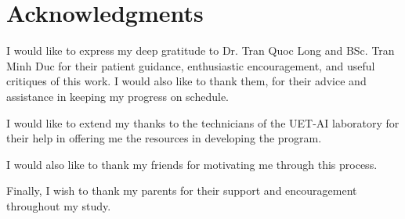 \chapter*{Acknowledgments}
\fontsize{13}{15}\selectfont

I would like to express my deep gratitude to Dr. Tran Quoc Long and BSc. Tran Minh Duc for their patient guidance, enthusiastic encouragement, and useful critiques of this work. I would also like to thank them, for their advice and assistance in keeping my progress on schedule. 
\par
I would like to extend my thanks to the technicians of the UET-AI laboratory for their help in offering me the resources in developing the program.
\par
I would also like to thank my friends for motivating me through this process.
\par
Finally, I wish to thank my parents for their support and encouragement throughout my study.\par